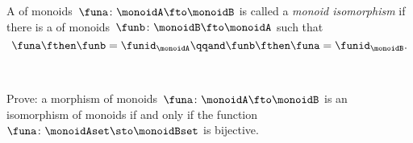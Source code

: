 \begin{ctdefinition}
    \label{def:monoid-iso}
    A \whomo of monoids~$\funa\colon \monoidA \fto \monoidB$ is called a \emph{monoid isomorphism} if there is a \whomo of monoids~$\funb\colon \monoidB \fto \monoidA$ such that
    \begin{equation}
        \funa \fthen \funb = \funid_\monoidA \qqand \funb \fthen \funa = \funid_\monoidB.
    \end{equation}
\end{ctdefinition}


\clearpage

~

\vfill%

\begin{gradedexercise}
    Prove: a morphism of monoids~$\funa\colon \monoidA \fto \monoidB$ is an isomorphism of monoids if and only if the function~$\funa\colon \monoidAset \sto \monoidBset$ is bijective.
\end{gradedexercise}

